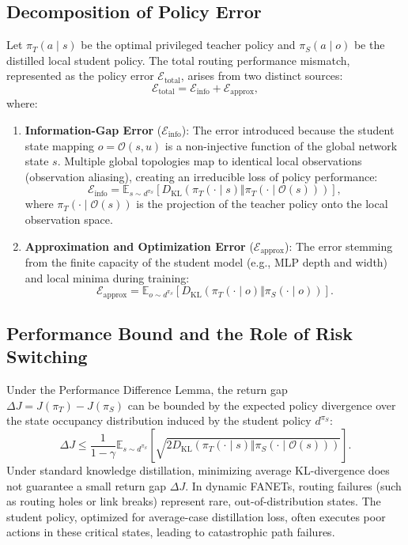 \subsection{Decomposition of Policy Error}
Let $\pi_T(a \mid s)$ be the optimal privileged teacher policy and $\pi_S(a \mid o)$ be the distilled local student policy. The total routing performance mismatch, represented as the policy error $\mathcal{E}_{\mathrm{total}}$, arises from two distinct sources:
\begin{equation}
    \mathcal{E}_{\mathrm{total}} = \mathcal{E}_{\mathrm{info}} + \mathcal{E}_{\mathrm{approx}},
\end{equation}
where:
\begin{enumerate}
    \item \textbf{Information-Gap Error} ($\mathcal{E}_{\mathrm{info}}$): The error introduced because the student state mapping $o = \mathcal{O}(s, u)$ is a non-injective function of the global network state $s$. Multiple global topologies map to identical local observations (observation aliasing), creating an irreducible loss of policy performance:
    \begin{equation}
        \mathcal{E}_{\mathrm{info}} = \mathbb{E}_{s \sim d^{\pi_S}} \left[ D_{\mathrm{KL}}(\pi_T(\cdot \mid s) \Vert \pi_T(\cdot \mid \mathcal{O}(s))) \right],
    \end{equation}
    where $\pi_T(\cdot \mid \mathcal{O}(s))$ is the projection of the teacher policy onto the local observation space.
    \item \textbf{Approximation and Optimization Error} ($\mathcal{E}_{\mathrm{approx}}$): The error stemming from the finite capacity of the student model (e.g., MLP depth and width) and local minima during training:
    \begin{equation}
        \mathcal{E}_{\mathrm{approx}} = \mathbb{E}_{o \sim d^{\pi_S}} \left[ D_{\mathrm{KL}}(\pi_T(\cdot \mid o) \Vert \pi_S(\cdot \mid o)) \right].
    \end{equation}
\end{enumerate}

\subsection{Performance Bound and the Role of Risk Switching}
Under the Performance Difference Lemma, the return gap $\Delta J = J(\pi_T) - J(\pi_S)$ can be bounded by the expected policy divergence over the state occupancy distribution induced by the student policy $d^{\pi_S}$:
\begin{equation}
    \Delta J \le \frac{1}{1-\gamma} \mathbb{E}_{s \sim d^{\pi_S}} \left[ \sqrt{2 D_{\mathrm{KL}}(\pi_T(\cdot \mid s) \Vert \pi_S(\cdot \mid \mathcal{O}(s)))} \right].
\end{equation}
Under standard knowledge distillation, minimizing average KL-divergence does not guarantee a small return gap $\Delta J$. In dynamic FANETs, routing failures (such as routing holes or link breaks) represent rare, out-of-distribution states. The student policy, optimized for average-case distillation loss, often executes poor actions in these critical states, leading to catastrophic path failures.

